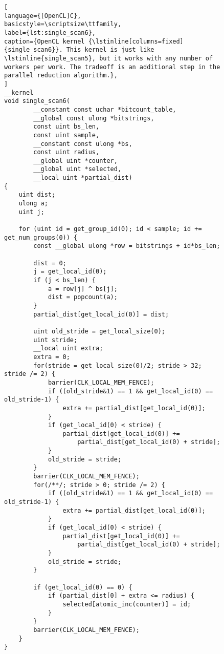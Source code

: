 \begin{figure}[!p]
\begin{lstlisting}[
language={[OpenCL]C},
basicstyle=\scriptsize\ttfamily,
label={lst:single_scan6},
caption={OpenCL kernel {\lstinline[columns=fixed]{single_scan6}}. This kernel is just like \lstinline{single_scan5}, but it works with any number of workers per work. The tradeoff is an additional step in the parallel reduction algorithm.},
]
__kernel
void single_scan6(
        __constant const uchar *bitcount_table,
        __global const ulong *bitstrings,
        const uint bs_len,
        const uint sample,
        __constant const ulong *bs,
        const uint radius,
        __global uint *counter,
        __global uint *selected,
        __local uint *partial_dist)
{
    uint dist;
    ulong a;
    uint j;

    for (uint id = get_group_id(0); id < sample; id += get_num_groups(0)) {
        const __global ulong *row = bitstrings + id*bs_len;

        dist = 0;
        j = get_local_id(0);
        if (j < bs_len) {
            a = row[j] ^ bs[j];
            dist = popcount(a);
        }
        partial_dist[get_local_id(0)] = dist;

        uint old_stride = get_local_size(0);
        uint stride;
        __local uint extra;
        extra = 0;
        for(stride = get_local_size(0)/2; stride > 32; stride /= 2) {
            barrier(CLK_LOCAL_MEM_FENCE);
            if ((old_stride&1) == 1 && get_local_id(0) == old_stride-1) {
                extra += partial_dist[get_local_id(0)];
            }
            if (get_local_id(0) < stride) {
                partial_dist[get_local_id(0)] +=
                    partial_dist[get_local_id(0) + stride];
            }
            old_stride = stride;
        }
        barrier(CLK_LOCAL_MEM_FENCE);
        for(/**/; stride > 0; stride /= 2) {
            if ((old_stride&1) == 1 && get_local_id(0) == old_stride-1) {
                extra += partial_dist[get_local_id(0)];
            }
            if (get_local_id(0) < stride) {
                partial_dist[get_local_id(0)] +=
                    partial_dist[get_local_id(0) + stride];
            }
            old_stride = stride;
        }

        if (get_local_id(0) == 0) {
            if (partial_dist[0] + extra <= radius) {
                selected[atomic_inc(counter)] = id;
            }
        }
        barrier(CLK_LOCAL_MEM_FENCE);
    }
}
\end{lstlisting}
\end{figure}

